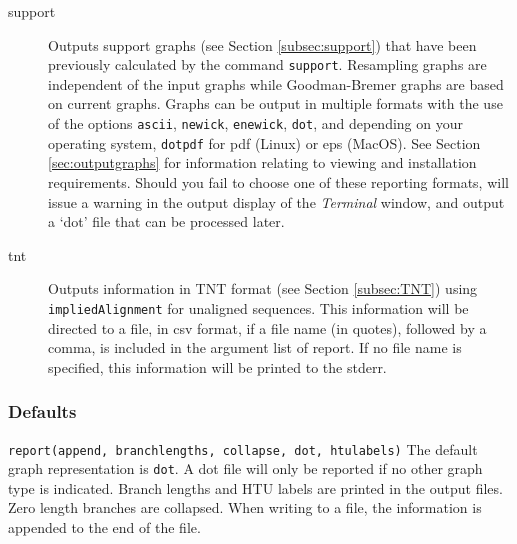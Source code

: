 \begin{description}
		\item[support] Outputs support graphs (see Section \ref{subsec:support})
		that have been previously calculated by the command \texttt{support}. 
		Resampling graphs \citep{Farrisetal1996} are independent of the input graphs 
		while Goodman-Bremer graphs \citep{Goodmanetal1982, bremer1994} are 
		based on current graphs. Graphs can be output in multiple formats with the
		use of the options \texttt{ascii}, \texttt{newick}, \texttt{enewick}, \texttt{dot}, 
		and depending on your operating system, \texttt{dotpdf} for pdf (Linux) or 
		eps (MacOS). See Section \ref{sec:outputgraphs} for information relating to 
		viewing and installation requirements. Should you fail to choose one of 
		these reporting formats, \phyg will issue a warning in the output display 
		of the \textit{Terminal} window, and output a `dot' file that can be processed 
		later.
		
		\item[tnt] Outputs information in TNT \citep{Goloboffetal2008} format (see Section
		\ref{subsec:TNT}) using \texttt{impliedAlignment} for unaligned sequences.
		This information will be directed to a file, in csv format, if a file name (in quotes), 
		followed by a comma, is included in the argument list of report. If no file name 
		is specified, this information will be printed to the stderr.
				 
	\end{description}			
		
	\subsubsection{Defaults}
		\texttt{report(append, branchlengths, collapse, dot, htulabels)}
		The default graph representation is \texttt{dot}. A dot file will only be 
		reported if no other graph type is indicated. Branch lengths and HTU 
		labels are printed in the output files. Zero length branches are collapsed. 
		When writing to a file, the information is appended to the end of the file. 
		
